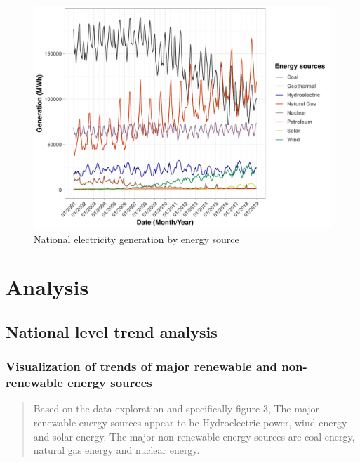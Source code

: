 \documentclass[12pt,]{article}
\begin{document}
\begin{figure}
\centering
\includegraphics{Kara_ENV872_Project_files/figure-latex/unnamed-chunk-16-1.pdf}
\caption{National electricity generation by energy source}
\end{figure}

\newpage

\section{Analysis}\label{analysis}

\subsection{National level trend
analysis}\label{national-level-trend-analysis}

\subsubsection{Visualization of trends of major renewable and
non-renewable energy
sources}\label{visualization-of-trends-of-major-renewable-and-non-renewable-energy-sources}

\begin{quote}
Based on the data exploration and specifically figure 3, The major
renewable energy sources appear to be Hydroelectric power, wind energy
and solar energy. The major non renewable energy sources are coal
energy, natural gas energy and nuclear energy.
\end{quote}
\end{document}
